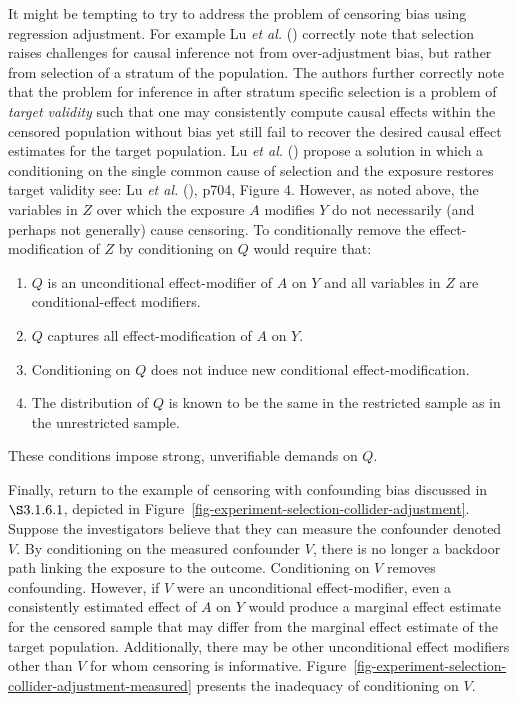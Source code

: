 \documentclass[
  singlecolumn]{article}
\providecommand{\tightlist}{%
  \setlength{\itemsep}{0pt}\setlength{\parskip}{0pt}}\usepackage{longtable,booktabs,array}
\begin{document}
It might be tempting to try to address the problem of censoring bias
using regression adjustment. For example Lu \emph{et al.}
() correctly note that selection raises
challenges for causal inference not from over-adjustment bias, but
rather from selection of a stratum of the population. The authors
further correctly note that the problem for inference in after stratum
specific selection is a problem of \emph{target validity} such that one
may consistently compute causal effects within the censored population
without bias yet still fail to recover the desired causal effect
estimates for the target population. Lu \emph{et al.}
() propose a solution in which a
conditioning on the single common cause of selection and the exposure
restores target validity see: Lu \emph{et al.}
(), p704, Figure 4. However, as noted above,
the variables in \(Z\) over which the exposure \(A\) modifies \(Y\) do
not necessarily (and perhaps not generally) cause censoring. To
conditionally remove the effect-modification of \(Z\) by conditioning on
\(Q\) would require that:

\begin{enumerate}
\def\labelenumi{\arabic{enumi}.}
\tightlist
\item
  \(Q\) is an unconditional effect-modifier of \(A\) on \(Y\) and all
  variables in \(Z\) are conditional-effect modifiers.
\item
  \(Q\) captures all effect-modification of \(A\) on \(Y\).
\item
  Conditioning on \(Q\) does not induce new conditional
  effect-modification.
\item
  The distribution of \(Q\) is known to be the same in the restricted
  sample as in the unrestricted sample.
\end{enumerate}

These conditions impose strong, unverifiable demands on \(Q\).

Finally, return to the example of censoring with confounding bias
discussed in \(\S 3.1.6.1\), depicted in
Figure~\ref{fig-experiment-selection-collider-adjustment}. Suppose the
investigators believe that they can measure the confounder denoted
\(V\). By conditioning on the measured confounder \(V\), there is no
longer a backdoor path linking the exposure to the outcome. Conditioning
on \(V\) removes confounding. However, if \(V\) were an unconditional
effect-modifier, even a consistently estimated effect of \(A\) on \(Y\)
would produce a marginal effect estimate for the censored sample that
may differ from the marginal effect estimate of the target population.
Additionally, there may be other unconditional effect modifiers other
than \(V\) for whom censoring is informative.
Figure~\ref{fig-experiment-selection-collider-adjustment-measured}
presents the inadequacy of conditioning on \(V\).
\end{document}
